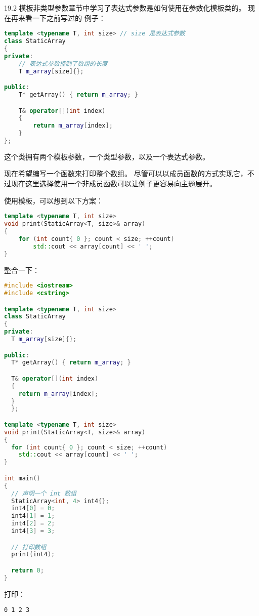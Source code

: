 \documentclass[../../LearnCpp.tex]{subfiles}
\begin{document}

19.2 模板非类型参数章节中学习了表达式参数是如何使用在参数化模板类的。
现在再来看一下之前写过的  例子：

\begin{lstlisting}[language=C++]
template <typename T, int size> // size 是表达式参数
class StaticArray
{
private:
    // 表达式参数控制了数组的长度
    T m_array[size]{};

public:
    T* getArray() { return m_array; }

    T& operator[](int index)
    {
        return m_array[index];
    }
};
\end{lstlisting}

这个类拥有两个模板参数，一个类型参数，以及一个表达式参数。

现在希望编写一个函数来打印整个数组。
尽管可以以成员函数的方式实现它，不过现在这里选择使用一个非成员函数可以让例子更容易向主题展开。

使用模板，可以想到以下方案：

\begin{lstlisting}[language=C++]
template <typename T, int size>
void print(StaticArray<T, size>& array)
{
    for (int count{ 0 }; count < size; ++count)
        std::cout << array[count] << ' ';
}
\end{lstlisting}

整合一下：

\begin{lstlisting}[language=C++]
#include <iostream>
#include <cstring>

template <typename T, int size>
class StaticArray
{
private:
  T m_array[size]{};

public:
  T* getArray() { return m_array; }

  T& operator[](int index)
  {
    return m_array[index];
  }
  };

template <typename T, int size>
void print(StaticArray<T, size>& array)
{
  for (int count{ 0 }; count < size; ++count)
    std::cout << array[count] << ' ';
}

int main()
{
  // 声明一个 int 数组
  StaticArray<int, 4> int4{};
  int4[0] = 0;
  int4[1] = 1;
  int4[2] = 2;
  int4[3] = 3;

  // 打印数组
  print(int4);

  return 0;
}
\end{lstlisting}

打印：

\begin{lstlisting}
0 1 2 3
\end{lstlisting}
\end{document}
